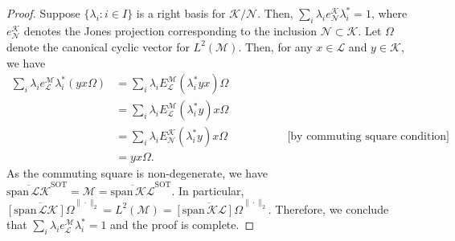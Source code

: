 \documentclass[10pt,a4paper]{amsart}
\begin{document}
\begin{proof}
 Suppose $\{\lambda_i:i\in I\}$ is a right basis for
 $\mathcal{K}/\mathcal{N}$. Then, $\sum_i\lambda_i
 e^{\mathcal{K}}_{\mathcal{N}}\lambda^*_i=1$, where
 $e^{\mathcal{K}}_{\mathcal{N}}$ denotes the Jones projection corresponding
 to the inclusion $\mathcal{N}\subset \mathcal{K}$. Let $\Omega$ denote the canonical cyclic vector for $L^2(\mathcal{M})$. Then, for any $x\in
 \mathcal{L}$ and $y\in \mathcal{K}$, we have
 \begin{align*}
 \sum_i \lambda_i e^{\mathcal{M}}_{\mathcal{L}} \lambda^*_i(yx\Omega)
 &= \sum_i \lambda_i E^{\mathcal{M}}_{\mathcal{L}}(\lambda^*_iyx)\Omega\\
 &= \sum_i \lambda_i E^{\mathcal{M}}_{\mathcal{L}}(\lambda^*_iy)x\Omega\\
 &= \sum_i \lambda_i E^{\mathcal{K}}_{\mathcal{N}}(\lambda^*_iy)x\Omega~~~~~~~~~~~~~~~\qquad \text{[by commuting square condition]}\\
 &= yx\Omega.
 \end{align*}
As the commuting square is non-degenerate, we have
$\overline{\mathrm{span}\, \mathcal{L}\mathcal{K}}^{\mathrm{SOT}}=\mathcal{M}=
\overline{\mathrm{span}\, \mathcal{K}\mathcal{L}}^{\mathrm{SOT}}$. In
particular,
$\overline{[\mathrm{span}\, \mathcal{L}\mathcal{K}] \Omega}^{\|\cdot\|_2}=
L^2(\mathcal{M})=
\overline{[\mathrm{span}\, \mathcal{K}\mathcal{L}]\Omega }^{\|\cdot\|_2}$.
Therefore, we conclude that $\sum_i
\lambda_ie^{\mathcal{M}}_{\mathcal{L}}\lambda^*_i=1$ and the proof is
complete.
\end{proof}
\end{document}
